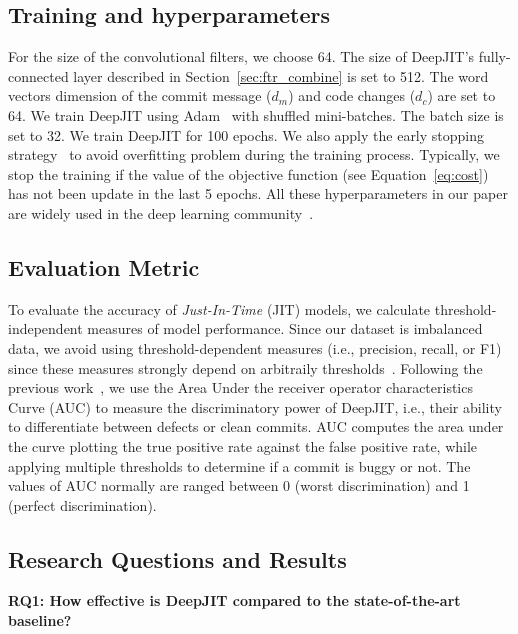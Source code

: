 \subsection{Training and hyperparameters}
\label{sec:training_parameters}
For the size of the convolutional filters, we choose 64. The size of DeepJIT's fully-connected layer described in Section~\ref{sec:ftr_combine} is set to 512. The word vectors dimension of the commit message ($d_m$) and code changes ($d_c$) are set to 64. We train DeepJIT using Adam~\cite{kingma2014adam} with shuffled mini-batches.  The batch size is set to 32. We train DeepJIT for 100 epochs. We also apply the early stopping strategy~\cite{prechelt1998automatic, caruana2001overfitting} to avoid overfitting problem during the training process. Typically, we stop the training if the value of the objective function (see Equation~\ref{eq:cost}) has not been update in the last 5 epochs. All these hyperparameters in our paper are widely used in the deep learning community~\cite{severyn2015learning, huo2016learning, huo2017enhancing, hinton2012improving}. 
 
\subsection{Evaluation Metric}
\label{sec:metric}
To evaluate the accuracy of \emph{Just-In-Time} (JIT) models, we calculate  threshold-independent measures of model performance. Since our dataset is imbalanced data, we avoid using threshold-dependent measures (i.e., precision, recall, or F1) since these measures strongly depend on arbitraily thresholds~\cite{nguyen2009learning, gu2008data}. Following the previous work~\cite{mcintosh2018fix},  we use the Area Under the receiver operator characteristics
Curve (AUC) to measure the discriminatory power of DeepJIT, i.e., their ability to differentiate between defects or clean commits. AUC computes the area under the curve plotting the true positive rate against the false positive rate, while applying multiple thresholds to determine if a commit is buggy or not. The values of AUC normally are ranged between 0 (worst discrimination) and 1 (perfect discrimination). 

\subsection{Research Questions and Results}
\label{sec:rq_results}

\noindent \textbf{RQ1: How effective is DeepJIT compared to the state-of-the-art baseline?}

